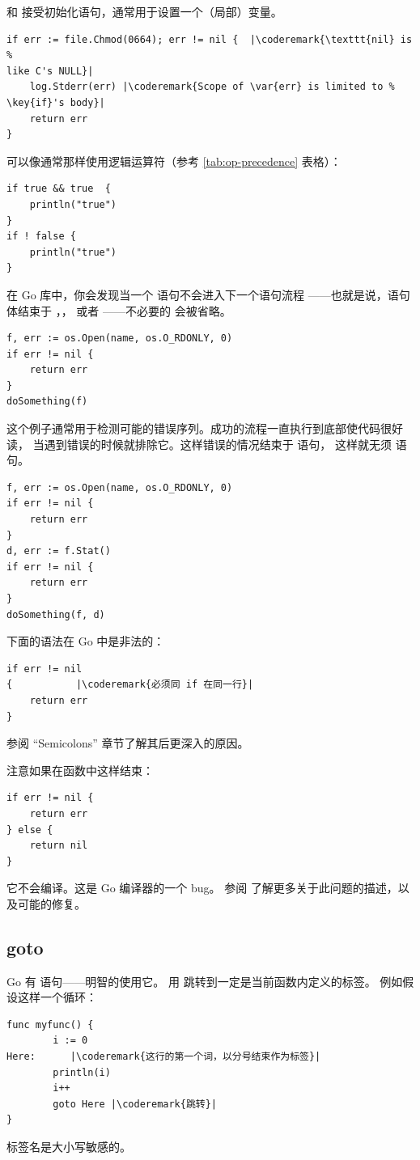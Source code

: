  和  接受初始化语句，通常用于设置一个（局部）变量。
\begin{lstlisting}
if err := file.Chmod(0664); err != nil {  |\coderemark{\texttt{nil} is %
like C's NULL}|
    log.Stderr(err) |\coderemark{Scope of \var{err} is limited to %
\key{if}'s body}|
    return err
}
\end{lstlisting}
可以像通常那样使用逻辑运算符（参考 \ref{tab:op-precedence} 表格）：
\begin{lstlisting}
if true && true  {
    println("true")
}
if ! false {
    println("true")
}
\end{lstlisting}

在 Go 库中，你会发现当一个  语句不会进入下一个语句流程
——也就是说，语句体结束于 ，，
或者 ——不必要的  会被省略。

\begin{lstlisting}
f, err := os.Open(name, os.O_RDONLY, 0)
if err != nil {
    return err
}
doSomething(f)
\end{lstlisting}
这个例子通常用于检测可能的错误序列。成功的流程一直执行到底部使代码很好读，
当遇到错误的时候就排除它。这样错误的情况结束于  语句，
这样就无须  语句。
\begin{lstlisting}
f, err := os.Open(name, os.O_RDONLY, 0)
if err != nil {
    return err
}
d, err := f.Stat()
if err != nil {
    return err
}
doSomething(f, d)
\end{lstlisting}
下面的语法在 Go 中是非法的：
\begin{lstlisting}
if err != nil
{		    |\coderemark{必须同 if 在同一行}|
    return err
}
\end{lstlisting}
参阅 \cite{effective_go} ``Semicolons'' 章节了解其后更深入的原因。

\begin{lbar}
注意如果在函数中这样结束：
\begin{lstlisting}
if err != nil {
    return err
} else {
    return nil
}
\end{lstlisting}
它不会编译。这是 Go 编译器的一个 bug。
参阅 \cite{go_issue_65} 了解更多关于此问题的描述，以及可能的修复。
\end{lbar}

\subsection{goto}
Go 有  语句——明智的使用它。
用  跳转到一定是当前函数内定义的标签。
例如假设这样一个循环：
\begin{lstlisting}
func myfunc() {
        i := 0                                                                                      
Here:	   |\coderemark{这行的第一个词，以分号结束作为标签}|
        println(i)
        i++ 
        goto Here |\coderemark{跳转}|
}
\end{lstlisting}
标签名是大小写敏感的。

